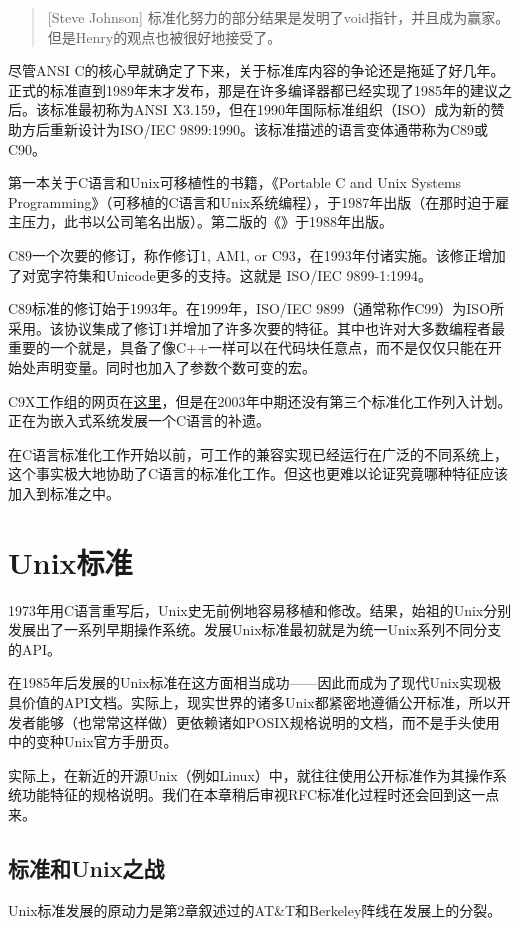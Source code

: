 \documentclass[12pt,oneside]{book}
\begin{document}
\begin{common-format}
\begin{quote}[Steve Johnson]
标准化努力的部分结果是发明了void指针，并且成为赢家。但是Henry的观点也被很好地接受了。
\end{quote}

尽管ANSI C的核心早就确定了下来，关于标准库内容的争论还是拖延了好几年。正式的标准直到1989年末才发布，那是在许多编译器都已经实现了1985年的建议之后。该标准最初称为ANSI X3.159，但在1990年国际标准组织（ISO）成为新的赞助方后重新设计为ISO/IEC 9899:1990。该标准描述的语言变体通带称为C89或C90。

第一本关于C语言和Unix可移植性的书籍，《Portable C and Unix Systems Programming》（可移植的C语言和Unix系统编程）\cite{Lapin}，于1987年出版（在那时迫于雇主压力，此书以公司笔名出版）。第二版的《\cite{Kernighan-Ritchie}》于1988年出版。

C89一个次要的修订，称作修订1, AM1, or C93，在1993年付诸实施。该修正增加了对宽字符集和Unicode更多的支持。这就是 ISO/IEC 9899-1:1994。

C89标准的修订始于1993年。在1999年，ISO/IEC 9899（通常称作C99）为ISO所采用。该协议集成了修订1并增加了许多次要的特征。其中也许对大多数编程者最重要的一个就是，具备了像C++一样可以在代码块任意点，而不是仅仅只能在开始处声明变量。同时也加入了参数个数可变的宏。

C9X工作组的网页在\href{http://anubis.dkuug.dk/JTC1/SC22/WG14/www/projects}{这里}，但是在2003年中期还没有第三个标准化工作列入计划。正在为嵌入式系统发展一个C语言的补遗。

在C语言标准化工作开始以前，可工作的兼容实现已经运行在广泛的不同系统上，这个事实极大地协助了C语言的标准化工作。但这也更难以论证究竟哪种特征应该加入到标准之中。

\section{Unix标准}
1973年用C语言重写后，Unix史无前例地容易移植和修改。结果，始祖的Unix分别发展出了一系列早期操作系统。发展Unix标准最初就是为统一Unix系列不同分支的API。

在1985年后发展的Unix标准在这方面相当成功——因此而成为了现代Unix实现极具价值的API文档。实际上，现实世界的诸多Unix都紧密地遵循公开标准，所以开发者能够（也常常这样做）更依赖诸如POSIX规格说明的文档，而不是手头使用中的变种Unix官方手册页。

实际上，在新近的开源Unix（例如Linux）中，就往往使用公开标准作为其操作系统功能特征的规格说明。我们在本章稍后审视RFC标准化过程时还会回到这一点来。

\subsection{标准和Unix之战}
Unix标准发展的原动力是第2章叙述过的AT\&{}T和Berkeley阵线在发展上的分裂。


\end{common-format}
\end{document}
